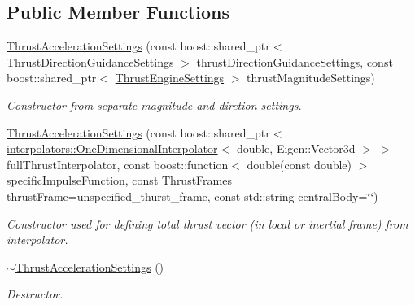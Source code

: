 \subsection*{Public Member Functions}
\begin{DoxyCompactItemize}
\item 
\hyperlink{classtudat_1_1simulation__setup_1_1ThrustAccelerationSettings_ade483b5bce614156367b642cf5fe6947}{Thrust\+Acceleration\+Settings} (const boost\+::shared\+\_\+ptr$<$ \hyperlink{classtudat_1_1simulation__setup_1_1ThrustDirectionGuidanceSettings}{Thrust\+Direction\+Guidance\+Settings} $>$ thrust\+Direction\+Guidance\+Settings, const boost\+::shared\+\_\+ptr$<$ \hyperlink{classtudat_1_1simulation__setup_1_1ThrustEngineSettings}{Thrust\+Engine\+Settings} $>$ thrust\+Magnitude\+Settings)
\begin{DoxyCompactList}\small\item\em Constructor from separate magnitude and diretion settings. \end{DoxyCompactList}\item 
\hyperlink{classtudat_1_1simulation__setup_1_1ThrustAccelerationSettings_af43db3815c573db4cad4573f3cf96274}{Thrust\+Acceleration\+Settings} (const boost\+::shared\+\_\+ptr$<$ \hyperlink{classtudat_1_1interpolators_1_1OneDimensionalInterpolator}{interpolators\+::\+One\+Dimensional\+Interpolator}$<$ double, Eigen\+::\+Vector3d $>$ $>$ full\+Thrust\+Interpolator, const boost\+::function$<$ double(const double) $>$ specific\+Impulse\+Function, const Thrust\+Frames thrust\+Frame=unspecified\+\_\+thurst\+\_\+frame, const std\+::string central\+Body=\char`\"{}\char`\"{})
\begin{DoxyCompactList}\small\item\em Constructor used for defining total thrust vector (in local or inertial frame) from interpolator. \end{DoxyCompactList}\item 
\hyperlink{classtudat_1_1simulation__setup_1_1ThrustAccelerationSettings_a8454a64ad1922663d0e7ab1e19aa4860}{$\sim$\+Thrust\+Acceleration\+Settings} ()\hypertarget{classtudat_1_1simulation__setup_1_1ThrustAccelerationSettings_a8454a64ad1922663d0e7ab1e19aa4860}{}\label{classtudat_1_1simulation__setup_1_1ThrustAccelerationSettings_a8454a64ad1922663d0e7ab1e19aa4860}

\begin{DoxyCompactList}\small\item\em Destructor. \end{DoxyCompactList}\end{DoxyCompactItemize}
